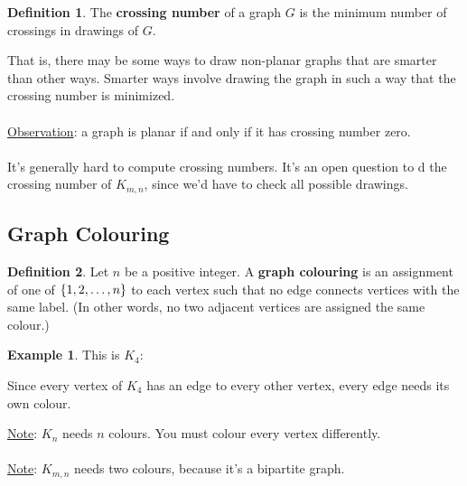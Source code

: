 \documentclass[]{article}
\theoremstyle{definition}
\newtheorem*{defn}{Definition}
\newtheorem{ex}{Example}[section]
\DeclarePairedDelimiter{\set}{\lbrace}{\rbrace}
\begin{document}
			\begin{defn}
				The \textbf{crossing number} of a graph $G$ is the minimum number of crossings in drawings of $G$.
			\end{defn}

			That is, there may be some ways to draw non-planar graphs that are smarter than other ways. Smarter ways involve drawing the graph in such a way that the crossing number is minimized.
			\\ \\
			\underline{Observation}: a graph is planar if and only if it has crossing number zero.
			\\ \\
			It's generally hard to compute crossing numbers. It's an open question to d the crossing number of $K_{m, n}$, since we'd have to check all possible drawings.

		\subsection{Graph Colouring}
			\begin{defn}
				Let $n$ be a positive integer. A \textbf{graph colouring} is an assignment of one of $\set{1, 2, \ldots, n}$ to each vertex such that no edge connects vertices with the same label. (In other words, no two adjacent vertices are assigned the same colour.)
			\end{defn}

			\begin{ex}
				This is $K_4$:
				\begin{center}
				\end{center}

				Since every vertex of $K_4$ has an edge to every other vertex, every edge needs its own colour.
			\end{ex}

			\underline{Note}: $K_n$ needs $n$ colours. You must colour every vertex differently.
			\\ \\
			\underline{Note}: $K_{m, n}$ needs two colours, because it's a bipartite graph.
\end{document}
